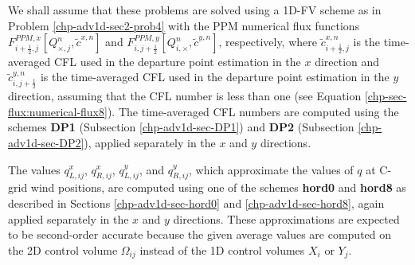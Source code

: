 We shall assume that these problems are solved using a 1D-FV scheme as in Problem \ref{chp-adv1d-sec2-prob4}
with the PPM numerical flux functions ${F}_{i+\frac{1}{2},j}^{PPM,x}[Q^n_{\times,j},\tilde{c}^{x,n}]$ and
${F}_{i,j+\frac{1}{2}}^{PPM,y}[Q^n_{i,\times},\tilde{c}^{y,n}]$, respectively,
where $\tilde{c}^{x,n}_{i+\frac{1}{2},j}$ is the time-averaged CFL used in the departure point estimation in the $x$ direction
and $\tilde{c}^{y,n}_{i,j+\frac{1}{2}}$ is the time-averaged CFL used in the departure point estimation in the $y$ direction,
assuming that the CFL number is less than one (see Equation \eqref{chp-sec-flux:numerical-flux8}).
The time-averaged CFL numbers are computed using the schemes 
\textbf{DP1} (Subsection \ref{chp-adv1d-sec-DP1}) and \textbf{DP2}
(Subsection \ref{chp-adv1d-sec-DP2}), applied separately in the $x$ and $y$ directions.

The values $q_{L,ij}^x$, $q_{R,ij}^x$, $q_{L,ij}^y$, and $q_{R,ij}^y$,
which approximate the values of $q$ at C-grid wind positions, are computed
using one of the schemes \textbf{hord0} and \textbf{hord8} as described
in Sections \ref{chp-adv1d-sec-hord0} and \ref{chp-adv1d-sec-hord8}, again
applied separately in the $x$ and $y$ directions.
These approximations are expected to be
second-order accurate because the given average values are computed on the
2D control volume $\Omega_{ij}$ instead of the 1D control volumes $X_i$ or $Y_j$.

